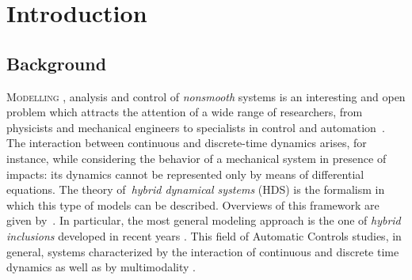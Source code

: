 \chapter{{Introduction}}
\label{chap:introduction}
\minitoc

\thispagestyle{empty}

\newpage


{}
\section{Background}

\lettrine[lines=4]{\color{brickred}M}{odelling} , analysis and control of \textit{nonsmooth} systems is an interesting and open problem which attracts the attention of a wide range of researchers, from physicists and mechanical engineers to specialists in control and automation~\cite{brogliato1999nonsmooth,stronge2018impact}.
The interaction between continuous and discrete-time dynamics arises, for instance, while considering the behavior of a mechanical system in presence of impacts: its dynamics cannot be represented only by means of differential equations. The theory of~\textit{hybrid dynamical systems} (HDS) is the formalism in which this type of models can be described. Overviews of this framework are given by~\cite{van2000introduction,haddad2006impulsive}. In particular, the most general modeling approach is the one of \textit{hybrid inclusions} developed in recent years \cite{goebel2009hybrid}. This field of Automatic Controls studies, in general, systems characterized by the interaction of continuous and discrete time dynamics as well as by multimodality \cite{Goebel2012}.
%
\newline

